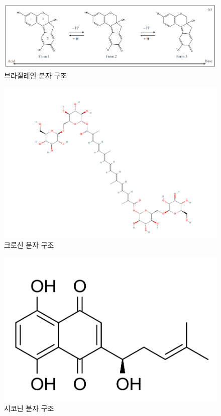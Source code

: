 \documentclass[%
 reprint,
 amsmath,amssymb,
 aps,
]{revtex4-2}
\begin{document}
\begin{figure}[htbp]
	\includegraphics[width = 0.95\linewidth]{Brazilein.png}%
	\caption{\label{fig:Brazilein}브라질레인 분자 구조}
\end{figure}
\begin{figure}[htbp]
	\includegraphics[width = 0.95\linewidth]{Corcin.png}%
	\caption{\label{fig:Corcin}크로신 분자 구조}
\end{figure}
\begin{figure}[htbp]
	\includegraphics[width = 0.7\linewidth]{Shikonin.png}%
	\caption{\label{fig:Shikonin}시코닌 분자 구조}
\end{figure}
\end{document}
